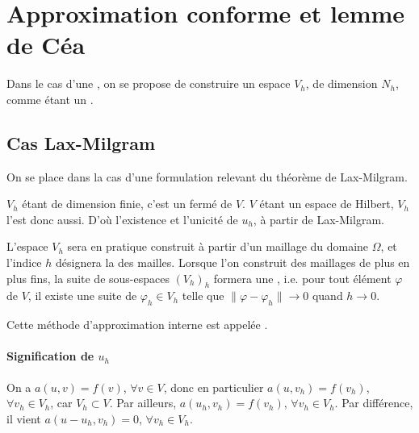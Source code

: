 \medskip
\section{Approximation conforme et lemme de Céa}\label{Sec-Cea}

Dans le cas d'une , on se propose de construire un espace $V_h$, de dimension $N_h$, comme
étant un .


\medskip
\subsection{Cas Lax-Milgram}

On se place dans la cas d'une formulation relevant du théorème de Lax-Milgram.

$V_h$ étant de dimension finie, c'est un fermé de $V$.
$V$ étant un espace de Hilbert, $V_h$ l'est donc aussi.
D'où l'existence et l'unicité de $u_h$, à partir de Lax-Milgram.

\medskip
L'espace $V_h$ sera en pratique construit à partir d'un maillage du domaine $\Omega$,
et l'indice $h$ désignera la  des mailles.
Lorsque l'on construit des maillages de plus en plus fins, la suite de sous-espaces
$(V_h)_h$ formera une  , i.e.
pour tout élément $\varphi$ de $V$, il existe une suite de $\varphi_h\in V_h$
telle que $\|\varphi-\varphi_h\|\rightarrow 0$ quand $h\rightarrow 0$.

Cette méthode d'approximation interne est appelée  .



\medskip
\paragraph{Signification de $u_h$}
On a $a(u,v) = f(v)$, $\forall v\in V$, donc en particulier
$a(u,v_h) = f(v_h)$, $\forall v_h\in V_h$, car $V_h\subset V$.
Par ailleurs, $a(u_h,v_h) = f(v_h)$, $\forall v_h\in V_h$.
Par différence, il vient $a(u-u_h,v_h) = 0$, $\forall v_h\in V_h$.

